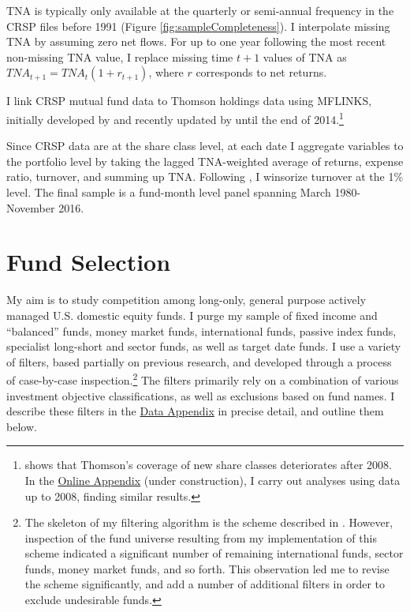\documentclass[]{book}
\let\rmarkdownfootnote\footnote%
\def\footnote{\protect\rmarkdownfootnote}
\theoremstyle{definition}
\theoremstyle{definition}
\theoremstyle{definition}
\theoremstyle{remark}
\begin{document}
TNA is typically only available at the quarterly or semi-annual
frequency in the CRSP files before 1991 (Figure
\ref{fig:sampleCompleteness}). I interpolate missing TNA by assuming
zero net flows. For up to one year following the most recent non-missing
TNA value, I replace missing time \(t+1\) values of TNA as
\(TNA_{t+1}=TNA_t(1+r_{t+1})\), where \(r\) corresponds to net returns.

I link CRSP mutual fund data to Thomson holdings data using MFLINKS,
initially developed by \citet{wermers00} and recently updated by
\citet{cx15} until the end of 2014.\footnote{\citet{zhu17} shows that
  Thomson's coverage of new share classes deteriorates after 2008. In
  the
  \href{https://www.dropbox.com/s/k7dygbn5slyrybc/Online_Appendix.pdf?dl=0}{Online
  Appendix} (under construction), I carry out analyses using data up to
  2008, finding similar results.}

Since CRSP data are at the share class level, at each date I aggregate
variables to the portfolio level by taking the lagged TNA-weighted
average of returns, expense ratio, turnover, and summing up TNA.
Following \citet{pst17}, I winsorize turnover at the 1\% level. The
final sample is a fund-month level panel spanning March 1980-November
2016.

\hypertarget{fund-selection}{%
\section{Fund Selection}\label{fund-selection}}

My aim is to study competition among long-only, general purpose actively
managed U.S. domestic equity funds. I purge my sample of fixed income
and ``balanced'' funds, money market funds, international funds, passive
index funds, specialist long-short and sector funds, as well as target
date funds. I use a variety of filters, based partially on previous
research, and developed through a process of case-by-case
inspection.\footnote{The skeleton of my filtering algorithm is the
  scheme described in \citet{ksz08}. However, inspection of the fund
  universe resulting from my implementation of this scheme indicated a
  significant number of remaining international funds, sector funds,
  money market funds, and so forth. This observation led me to revise
  the scheme significantly, and add a number of additional filters in
  order to exclude undesirable funds.} The filters primarily rely on a
combination of various investment objective classifications, as well as
exclusions based on fund names. I describe these filters in the
\href{https://www.dropbox.com/s/qugvhb8b0wqp0cg/LJ_JMP_Data_Appendix.pdf?dl=0}{Data
Appendix} in precise detail, and outline them below.
\end{document}
